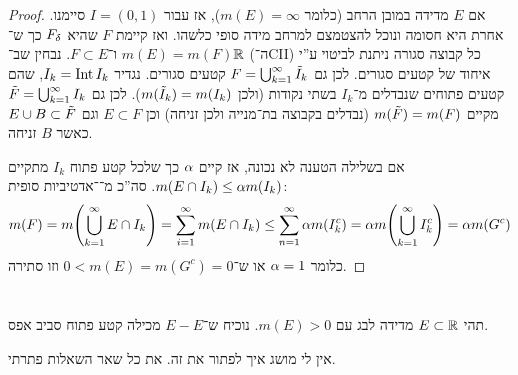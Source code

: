 \documentclass[]{../../../../tex/classes/homework}
\begin{document}
	\begin{proof}
		אם $E$ מדידה במובן הרחב (כלומר $m(E) = \infty$), אז עבור $I = (0, 1)$ סיימנו. 
	אחרת היא חסומה ונוכל להצטמצם למרחב מידה סופי כלשהו. ואז קיימת $F$ שהיא $F_\delta$ כך ש־$m(E) = m(F)$ ו־$F \subset E$. נבחין שב־$\mathbb{R}$ (ה־CII) כל קבוצה סגורה ניתנת לביטוי ע''י איחוד של קטעים סגורים. לכן גם $F = \bigcup_{k = 1}^{\infty} \tilde I_k$ קטעים סגורים. נגדיר $I_k = \operatorname{Int} I_k$, שהם קטעים פתוחים שנבדלים מ־$I_k$ בשתי נקודות (ולכן $m(\tilde I_k) = m(I_k)$). לכן גם $\tilde F = \bigcup_{k = 1}^{\infty}I_k$ מקיים $m(\tilde F) = m(F)$ (נבדלים בקבוצה בת־מנייה ולכן זניחה) וכן $E \subset F$ וגם $E \cup B \subset \tilde F$ כאשר $B$ זניחה. 
		
		אם בשלילה הטענה לא נכונה, אז קיים $\alpha$ כך שלכל קטע פתוח $I_k$ מתקיים $m(E \cap I_k) \le \alpha m(I_k)$. סה''כ מ־\ס־אדטיביות סופית: 
		\[ m(F) = m\!\left ( \bigcup_{k =1}^{\infty} E \cap I_k \right ) = \sum_{i = 1}^{\infty}m(E \cap I_k) \le \sum_{n = 1}^{\infty}\alpha m(I_k^{c}) = \alpha m\!\left ( \bigcup_{k = 1}^{\infty}I_k^{c} \right ) = \alpha m(G^{c}) \]
		כלומר $\alpha = 1$ או ש־$0 < m(E) = m(G^{c}) = 0$ וזו סתירה. 
	\end{proof}
	
	\section{}
	תהי $E \subset \mathbb{R}$ מדידה לבג עם $m(E) > 0$. נוכיח ש־$E - E$ מכילה קטע פתוח סביב אפס. 
%		

	אין לי מושג איך לפתור את זה. את כל שאר השאלות פתרתי. 
	
\end{document}
